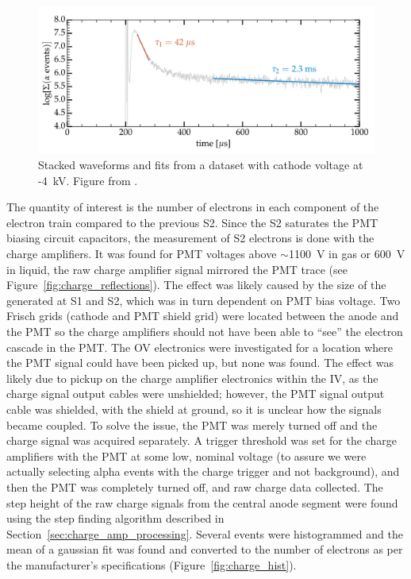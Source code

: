 \begin{figure}[htbp]
\begin{center}
\includegraphics[width=\textwidth]{figures/etrains/etrain_stack.png}
\caption{Stacked waveforms and fits from a dataset with cathode voltage at -4~kV. Figure from \cite{SorensenKamdin2018}. }
\label{fig:etrain_stack}
\end{center}
\end{figure}

The quantity of interest is the number of electrons in each component of the electron train compared to the previous S2. Since the S2 saturates the \ac{PMT} biasing circuit capacitors, the measurement of S2 electrons is done with the charge amplifiers. It was found for \ac{PMT} voltages above $\sim$1100~V in gas or 600~V in liquid, the raw charge amplifier signal mirrored the \ac{PMT} trace (see Figure~\ref{fig:charge_reflections}). The effect was likely caused by the size of the generated at S1 and S2, which was in turn dependent on \ac{PMT} bias voltage. Two Frisch grids (cathode and \ac{PMT} shield grid) were located between the anode and the \ac{PMT} so the charge amplifiers should not have been able to ``see'' the electron cascade in the \ac{PMT}. The \ac{OV} electronics were investigated for a location where the \ac{PMT} signal could have been picked up, but none was found. The effect was likely due to pickup on the charge amplifier electronics within the \ac{IV}, as the charge signal output cables were unshielded; however, the \ac{PMT} signal output cable was shielded, with the shield at ground, so it is unclear how the signals became coupled. To solve the issue, the \ac{PMT} was merely turned off and the charge signal was acquired separately. A trigger threshold was set for the charge amplifiers with the \ac{PMT} at some low, nominal voltage (to assure we were actually selecting alpha events with the charge trigger and not background), and then the \ac{PMT} was completely turned off, and raw charge data collected.  The step height of the raw charge signals from the central anode segment were found using the step finding algorithm described in Section~\ref{sec:charge_amp_processing}. Several events were histogrammed and the mean of a gaussian fit was found and converted to the number of electrons as per the manufacturer's specifications (Figure~\ref{fig:charge_hist}). 

